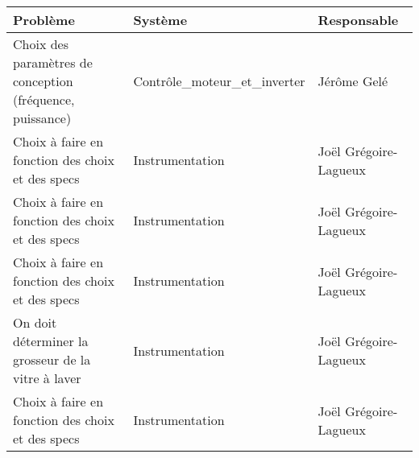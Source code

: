 \begin{tabularx}{\linewidth}{
    |>{\hsize=2.0\hsize}X|%
    >{\hsize=0.5\hsize}X|%
    >{\hsize=0.5\hsize}X|%
  }
    \hline
    Problème & Système & Responsable \\\hline
    Choix des paramètres de conception (fréquence, puissance) & Contrôle_moteur_et_inverter & Jérôme Gelé \\\hline
    Choix à faire en fonction des choix et des specs & Instrumentation & Joël Grégoire-Lagueux \\\hline
    Choix à faire en fonction des choix et des specs & Instrumentation & Joël Grégoire-Lagueux \\\hline
    Choix à faire en fonction des choix et des specs & Instrumentation & Joël Grégoire-Lagueux \\\hline
    On doit déterminer la grosseur de la vitre à laver & Instrumentation & Joël Grégoire-Lagueux \\\hline
    Choix à faire en fonction des choix et des specs & Instrumentation & Joël Grégoire-Lagueux \\\hline
  \end{tabularx}
     